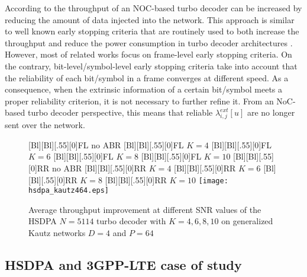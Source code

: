 \documentclass[10pt,twocolumn,journal]{IEEEtran}
\begin{document}
According to \cite{baghdadi_EL06} the throughput of an NOC-based turbo decoder can be increased by reducing the 
amount of data injected into the network. This approach is similar to well known early stopping criteria 
that are routinely used to both increase the throughput and reduce the power consumption in turbo decoder architectures 
\cite{chandrakasan_CICC10}. 
However, most of related works focus on frame-level early stopping criteria. On the contrary, bit-level/symbol-level 
early stopping criteria \cite{kim_CL06} take into account that the reliability of each bit/symbol in a frame converges at 
different speed. As a consequence, when the extrinsic information of a certain bit/symbol meets a proper reliability 
criterion, it is not necessary to further refine it. From an NoC-based turbo decoder perspective, this means 
that reliable $\lambda^{ext}_{i,j}[u]$ are no longer sent over the network. 
\begin{figure}
    \centering
      [Bl][Bl][.55][0]{FL no ABR}
      [Bl][Bl][.55][0]{FL $K=4$}
      [Bl][Bl][.55][0]{FL $K=6$}
      [Bl][Bl][.55][0]{FL $K=8$}
      [Bl][Bl][.55][0]{FL $K=10$}
      [Bl][Bl][.55][0]{RR no ABR}
      [Bl][Bl][.55][0]{RR $K=4$}
      [Bl][Bl][.55][0]{RR $K=6$}
      [Bl][Bl][.55][0]{RR $K=8$}
      [Bl][Bl][.55][0]{RR $K=10$}
      \texttt{[image: hsdpa\_kautz464.eps]}
\caption{Average throughput improvement at different SNR values of the HSDPA $N=5114$ turbo decoder with $K=4, 6, 8, 10$ 
on generalized Kautz networks $D=4$ and $P=64$}
\label{fig:ABR_hsdpa4}
\end{figure}

\subsection{HSDPA and 3GPP-LTE case of study}
\label{subsec:hsdpa_lte}
\end{document}
